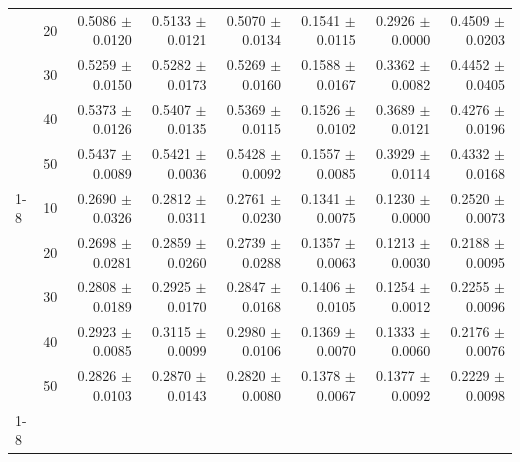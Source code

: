 \begin{table}[t]
\begin{tabular}{llrrrrrr}
 & 20 & 0.5086 $\pm$ 0.0120 & 0.5133 $\pm$ 0.0121 & 0.5070 $\pm$ 0.0134 & 0.1541 $\pm$ 0.0115 & 0.2926 $\pm$ 0.0000 & 0.4509 $\pm$ 0.0203 \\
 & 30 & 0.5259 $\pm$ 0.0150 & 0.5282 $\pm$ 0.0173 & 0.5269 $\pm$ 0.0160 & 0.1588 $\pm$ 0.0167 & 0.3362 $\pm$ 0.0082 & 0.4452 $\pm$ 0.0405 \\
 & 40 & 0.5373 $\pm$ 0.0126 & 0.5407 $\pm$ 0.0135 & 0.5369 $\pm$ 0.0115 & 0.1526 $\pm$ 0.0102 & 0.3689 $\pm$ 0.0121 & 0.4276 $\pm$ 0.0196 \\
 & 50 & 0.5437 $\pm$ 0.0089 & 0.5421 $\pm$ 0.0036 & 0.5428 $\pm$ 0.0092 & 0.1557 $\pm$ 0.0085 & 0.3929 $\pm$ 0.0114 & 0.4332 $\pm$ 0.0168 \\
\cline{1-8}
\multirow[t]{5}{*}{VNTC--CNTT} & 10 & 0.2690 $\pm$ 0.0326 & 0.2812 $\pm$ 0.0311 & 0.2761 $\pm$ 0.0230 & 0.1341 $\pm$ 0.0075 & 0.1230 $\pm$ 0.0000 & 0.2520 $\pm$ 0.0073 \\
 & 20 & 0.2698 $\pm$ 0.0281 & 0.2859 $\pm$ 0.0260 & 0.2739 $\pm$ 0.0288 & 0.1357 $\pm$ 0.0063 & 0.1213 $\pm$ 0.0030 & 0.2188 $\pm$ 0.0095 \\
 & 30 & 0.2808 $\pm$ 0.0189 & 0.2925 $\pm$ 0.0170 & 0.2847 $\pm$ 0.0168 & 0.1406 $\pm$ 0.0105 & 0.1254 $\pm$ 0.0012 & 0.2255 $\pm$ 0.0096 \\
 & 40 & 0.2923 $\pm$ 0.0085 & 0.3115 $\pm$ 0.0099 & 0.2980 $\pm$ 0.0106 & 0.1369 $\pm$ 0.0070 & 0.1333 $\pm$ 0.0060 & 0.2176 $\pm$ 0.0076 \\
 & 50 & 0.2826 $\pm$ 0.0103 & 0.2870 $\pm$ 0.0143 & 0.2820 $\pm$ 0.0080 & 0.1378 $\pm$ 0.0067 & 0.1377 $\pm$ 0.0092 & 0.2229 $\pm$ 0.0098 \\
\cline{1-8}
\bottomrule
\end{tabular}

\end{table}
